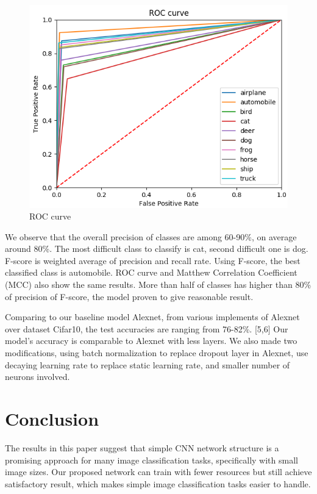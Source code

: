\documentclass[journal,onecolumn]{IEEEtran}
\begin{document}
\begin{figure}[!t]
\includegraphics[width=0.6\paperwidth]{images/roc}
\caption{ROC curve}
\end{figure}


We observe that the overall precision of classes are among 60-90\%, on average around 80\%. The most difficult class to classify is cat, second difficult one is dog. F-score is weighted average of precision and recall rate. Using F-score, the best classified class is automobile. ROC curve and Matthew Correlation Coefficient (MCC) also show the same results. More than half of classes has higher than 80\% of precision of F-score, the model proven to give reasonable result.

Comparing to our baseline model Alexnet, from various implements of Alexnet over dataset Cifar10, the test accuracies are ranging from 76-82\%. [5,6] Our model’s accuracy is comparable to Alexnet with less layers. We also made two modifications, using batch normalization to replace dropout layer in Alexnet, use decaying learning rate to replace static learning rate, and smaller number of neurons involved.


\section{Conclusion}
The results in this paper suggest that simple CNN network structure is a promising approach for many image classification tasks, specifically with small image sizes. Our proposed network can train with fewer resources but still achieve satisfactory result, which makes simple image classification tasks easier to handle.
\end{document}
